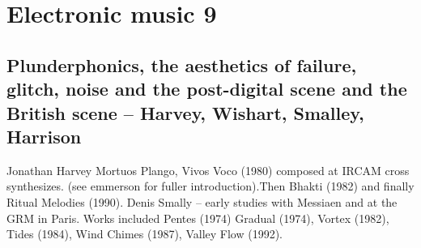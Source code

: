 
\chapter{Electronic music 9}
\label{history9}

\section{Plunderphonics, the aesthetics of failure, glitch, noise and the post-digital scene and the British scene – Harvey, Wishart, Smalley, Harrison}


Jonathan Harvey Mortuos Plango, Vivos Voco (1980) composed at IRCAM cross synthesizes. (see emmerson for fuller introduction).Then Bhakti (1982) and finally Ritual Melodies (1990). 
Denis Smally – early studies with Messiaen and at the GRM in Paris. Works included Pentes (1974) Gradual (1974), Vortex (1982), Tides (1984), Wind Chimes (1987), Valley Flow (1992).


